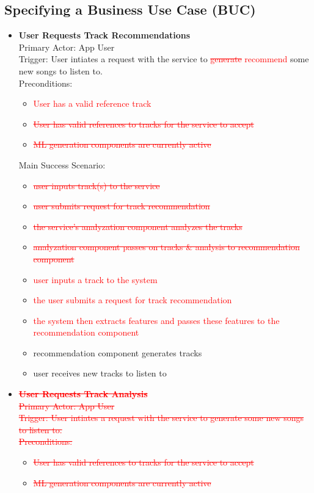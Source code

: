 \documentclass[12pt]{article}
\begin{document}
\subsection{Specifying a Business Use Case (BUC)}
\begin{itemize}
  \item \textbf{User Requests Track Recommendations}
    \\Primary Actor: App User
    \\Trigger: User intiates a request with the service to \textcolor{red}{\sout{generate}} \textcolor{red}{recommend} some new songs to listen to. 
    \\Preconditions: 
    \begin{itemize}
    \item \textcolor{red}{User has a valid reference track}
    \item \textcolor{red}{\sout{User has valid references to tracks for the service to accept}}
    \item \textcolor{red}{\sout{ML generation components are currently active}}
    \end{itemize}

    Main Success Scenario: 
    \begin{itemize}
    \item \textcolor{red}{\sout{user inputs track(s) to the service}}
    \item \textcolor{red}{\sout{user submits request for track recommendation}}
    \item \textcolor{red}{\sout{the service's analyzation component analyzes the tracks}}
    \item \textcolor{red}{\sout{analyzation component passes on tracks \& analysis to recommendation component}}
    \item \textcolor{red}{user inputs a track to the system}
    \item \textcolor{red}{the user submits a request for track recommendation}
    \item \textcolor{red}{the system then extracts features and passes these features to the recommendation component}
    \item recommendation component generates tracks
    \item user receives new tracks to listen to
    \end{itemize}
  
  \item \textcolor{red}{\sout{\textbf{User Requests Track Analysis}}}
    \\\textcolor{red}{\sout{Primary Actor: App User}}
    \\\textcolor{red}{\sout{Trigger: User intiates a request with the service to generate some new songs to listen to. }}
    \\\textcolor{red}{\sout{Preconditions: }}
    \begin{itemize}
    \item \textcolor{red}{\sout{User has valid references to tracks for the service to accept}}
    \item \textcolor{red}{\sout{ML generation components are currently active}}
    \end{itemize}


\end{itemize}
\end{document}
